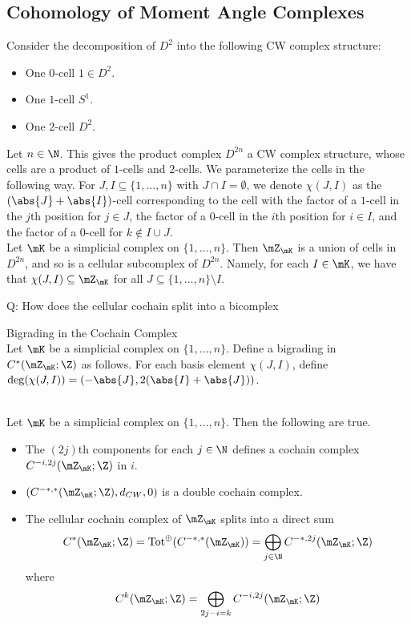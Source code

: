 \documentclass[a4paper]{article}
\begin{document}
\subsection{Cohomology of Moment Angle Complexes}
Consider the decomposition of $D^2$ into the following CW complex structure: 
\begin{itemize}
\item One $0$-cell $1\in D^2$. 
\item One $1$-cell $S^1$. 
\item One $2$-cell $D^2$. 
\end{itemize}

Let $n\in\N$. This gives the product complex $D^{2n}$ a CW complex structure, whose cells are a product of $1$-cells and $2$-cells. We parameterize the cells in the following way. For $J,I\subseteq\{1,\dots,n\}$ with $J\cap I=\emptyset$, we denote $\chi(J,I)$ as the $(\abs{J}+\abs{I})$-cell corresponding to the cell with the factor of a $1$-cell in the $j$th position for $j\in J$, the factor of a $0$-cell in the $i$th position for $i\in I$, and the factor of a $0$-cell for $k\notin I\cup J$. \\

Let $\mK$ be a simplicial complex on $\{1,\dots,n\}$. Then $\mZ_\mK$ is a union of cells in $D^{2n}$, and so is a cellular subcomplex of $D^{2n}$. Namely, for each $I\in\mK$, we have that $\chi(J,I)\subseteq\mZ_\mK$ for all $J\subseteq\{1,\dots,n\}\setminus I$. 


Q: How does the cellular cochain split into a bicomplex

\begin{defn}{Bigrading in the Cochain Complex}{}\\
Let $\mK$ be a simplicial complex on $\{1,\dots,n\}$. Define a bigrading in $C^\ast(\mZ_\mK;\Z)$ as follows. For each basis element $\chi(J,I)$, define $\deg(\chi(J,I))=(-\abs{J},2(\abs{I}+\abs{J}))$. 
\end{defn}

\begin{lmm}{}{}\\
Let $\mK$ be a simplicial complex on $\{1,\dots,n\}$. Then the following are true. 
\begin{itemize}
\item The $(2j)$th components for each $j\in\N$ defines a cochain complex $C^{-i,2j}(\mZ_\mK;\Z)$ in $i$. 
\item $(C^{-\ast,\ast}(\mZ_\mK;\Z),d_{CW},0)$ is a double cochain complex. 
\item The cellular cochain complex of $\mZ_\mK$ splits into a direct sum $$C^\ast(\mZ_\mK;\Z)=\text{Tot}^\oplus(C^{-\ast,\ast}(\mZ_\mK))=\bigoplus_{j\in\N}C^{-\ast,2j}(\mZ_\mK;\Z)$$ where $$C^k(\mZ_\mK;\Z)=\bigoplus_{2j-i=k}C^{-i,2j}(\mZ_\mK;\Z)$$
\end{itemize}
\end{lmm}
\end{document}
